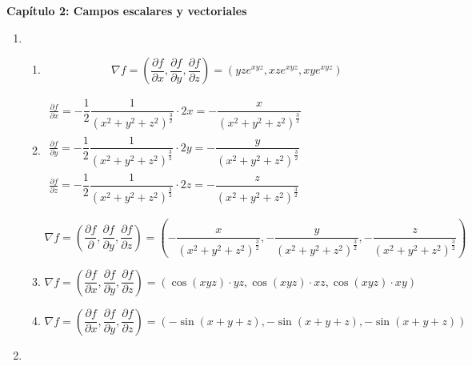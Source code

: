 \textbf{\Large Capítulo 2: Campos escalares y vectoriales}
\begin{enumerate}[label=\color{red}\textbf{\arabic*)}]
  \item {}
    \begin{enumerate}[label=\color{red}\textbf{\alph*)}]
      \item {}
      
      \[
          \nabla f=\left( \frac{\partial f}{\partial x} ,\frac{\partial f}{\partial y} ,\frac{\partial f}{\partial z}  \right) =(yze^{xyz},xze^{xyz},xye^{xyz}   )
          \] 
      \item {} 
      
      $\begin{array}{l}
        \frac{\partial f}{\partial x} =-\dfrac{1}{2}\dfrac{1}{(x^2+y^2+z^2)^{\frac{3}{2}}} \cdot 2x=-\dfrac{x}{(x^2+y^2+z^2)^{\frac{3}{2} }} \\
        \frac{\partial f}{\partial y} =-\dfrac{1}{2}\dfrac{1}{(x^2+y^2+z^2)^{\frac{3}{2}}} \cdot 2y=-\dfrac{y}{(x^2+y^2+z^2)^{\frac{3}{2} }} \\
        \frac{\partial f}{\partial z} =-\dfrac{1}{2}\dfrac{1}{(x^2+y^2+z^2)^{\frac{3}{2}}} \cdot 2z=-\dfrac{z}{(x^2+y^2+z^2)^{\frac{3}{2} }} 
      \end{array}$

      \[
        \nabla f=\left( \frac{\partial f}{\partial }, \frac{\partial f}{\partial y} ,\frac{\partial f}{\partial z}   \right) =\left(-\dfrac{x}{(x^2+y^2+z^2)^{\frac{3}{2} }},-\dfrac{y}{(x^2+y^2+z^2)^{\frac{3}{2} }},-\dfrac{z}{(x^2+y^2+z^2)^{\frac{3}{2} }}\right) 
          \] 
      \item {} 
        \[
        \nabla f=\left( \frac{\partial f}{\partial x} ,\frac{\partial f}{\partial y} ,\frac{\partial f}{\partial z}  \right) =\left( \cos(xyz)\cdot yz,\cos(xyz)\cdot xz,\cos(xyz)\cdot xy \right) 
        \] 
      \item {} 
        \[
        \nabla f=\left( \frac{\partial f}{\partial x} ,\frac{\partial f}{\partial y} ,\frac{\partial f}{\partial z} \right) =(-\sin(x+y+z), -\sin(x+y+z), -\sin(x+y+z))
        \] 
    \end{enumerate}
  \item {}


\end{enumerate}
